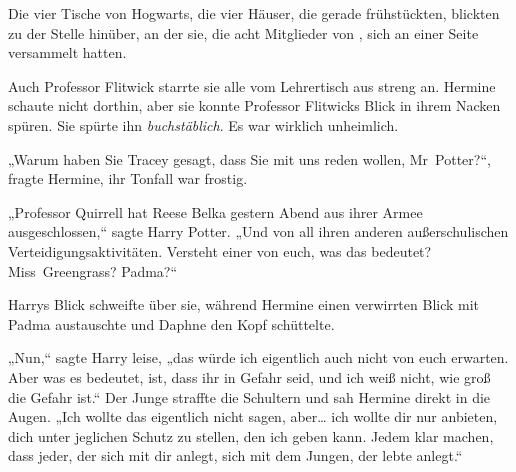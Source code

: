 Die vier Tische von Hogwarts, die vier Häuser, die gerade frühstückten, blickten zu der Stelle hinüber, an der sie, die acht Mitglieder von \SPHEW, sich an einer Seite versammelt hatten.

Auch Professor Flitwick starrte sie alle vom Lehrertisch aus streng an. Hermine schaute nicht dorthin, aber sie konnte Professor Flitwicks Blick in ihrem Nacken spüren. Sie spürte ihn \emph{buchstäblich}. Es war wirklich unheimlich.

„Warum haben Sie Tracey gesagt, dass Sie mit uns reden wollen, Mr~Potter?“, fragte Hermine, ihr Tonfall war frostig.

„Professor Quirrell hat Reese Belka gestern Abend aus ihrer Armee ausgeschlossen,“ sagte Harry Potter. „Und von all ihren anderen außerschulischen Verteidigungsaktivitäten. Versteht einer von euch, was das bedeutet? Miss~Greengrass? Padma?“

Harrys Blick schweifte über sie, während Hermine einen verwirrten Blick mit Padma austauschte und Daphne den Kopf schüttelte.

„Nun,“ sagte Harry leise, „das würde ich eigentlich auch nicht von euch erwarten. Aber was es bedeutet, ist, dass ihr in Gefahr seid, und ich weiß nicht, wie groß die Gefahr ist.“ Der Junge straffte die Schultern und sah Hermine direkt in die Augen. „Ich wollte das eigentlich nicht sagen, aber… ich wollte dir nur anbieten, dich unter jeglichen Schutz zu stellen, den ich geben kann. Jedem klar machen, dass jeder, der sich mit dir anlegt, sich mit dem Jungen, der lebte anlegt.“

